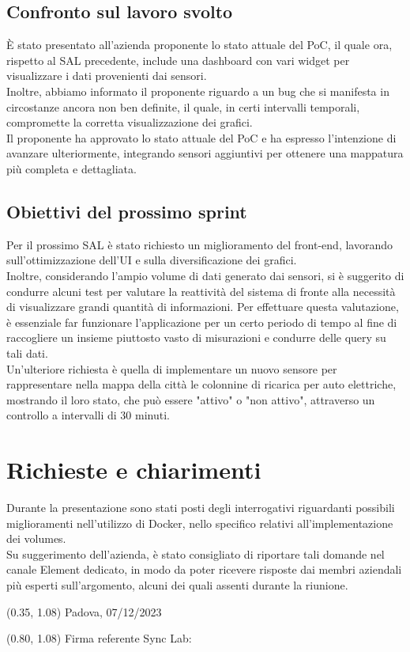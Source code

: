 \documentclass{article}
\begin{document}
    \subsection{Confronto sul lavoro svolto}
    È stato presentato all'azienda proponente lo stato attuale del PoC, il quale ora, rispetto al SAL precedente, include una dashboard con vari widget per visualizzare i dati provenienti dai sensori. \\
    Inoltre, abbiamo informato il proponente riguardo a un bug che si manifesta in circostanze ancora non ben definite, il quale, in certi intervalli temporali, compromette la corretta visualizzazione dei grafici. \\
    Il proponente ha approvato lo stato attuale del PoC e ha espresso l'intenzione di avanzare ulteriormente, integrando sensori aggiuntivi per ottenere una mappatura più completa e dettagliata.

    \subsection{Obiettivi del prossimo sprint}
    Per il prossimo SAL è stato richiesto un miglioramento del front-end, lavorando sull'ottimizzazione dell'UI e sulla diversificazione dei grafici. \\
    Inoltre, considerando l'ampio volume di dati generato dai sensori, si è suggerito di condurre alcuni test per valutare la reattività del sistema di fronte alla necessità di visualizzare grandi quantità di informazioni. Per effettuare questa valutazione, è essenziale far funzionare l'applicazione per un certo periodo di tempo al fine di raccogliere un insieme piuttosto vasto di misurazioni e condurre delle query su tali dati. \\
    Un'ulteriore richiesta è quella di implementare un nuovo sensore per rappresentare nella mappa della città le colonnine di ricarica per auto elettriche, mostrando il loro stato, che può essere "attivo" o "non attivo", attraverso un controllo a intervalli di 30 minuti.

\section{Richieste e chiarimenti}
    Durante la presentazione sono stati posti degli interrogativi riguardanti possibili miglioramenti nell'utilizzo di Docker, nello specifico relativi all'implementazione dei volumes. \\
    Su suggerimento dell'azienda, è stato consigliato di riportare tali domande nel canale Element dedicato, in modo da poter ricevere risposte dai membri aziendali più esperti sull'argomento, alcuni dei quali assenti durante la riunione.

\begin{textblock*}{\textwidth}(0.35\textwidth, 1.08\textheight)
    Padova, 07/12/2023
\end{textblock*}

\begin{textblock*}{\textwidth}(0.80\textwidth, 1.08\textheight)
        Firma referente Sync Lab:
\end{textblock*}
\end{document}
